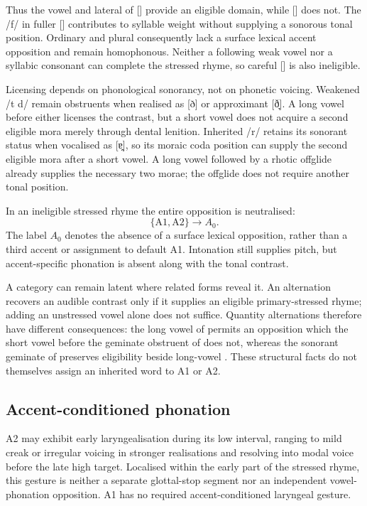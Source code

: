 Thus the vowel and lateral of  [] provide an eligible domain, while  [] does not. The /f/ in fuller [] contributes to syllable weight without supplying a sonorous tonal position. Ordinary  and plural  consequently lack a surface lexical accent opposition and remain homophonous. Neither a following weak vowel nor a syllabic consonant can complete the stressed rhyme, so careful [] is also ineligible.

Licensing depends on phonological sonorancy, not on phonetic voicing. Weakened /t d/ remain obstruents when realised as [ð] or approximant [ð̞]. A long vowel before either licenses the contrast, but a short vowel does not acquire a second eligible mora merely through dental lenition. Inherited /r/ retains its sonorant status when vocalised as [ɐ̯], so its moraic coda position can supply the second eligible mora after a short vowel. A long vowel followed by a rhotic offglide already supplies the necessary two morae; the offglide does not require another tonal position.

In an ineligible stressed rhyme the entire opposition is neutralised:
\[
    \{\mathrm{A1},\mathrm{A2}\}\longrightarrow A_0.
\]
The label $A_0$ denotes the absence of a surface lexical opposition, rather than a third accent or assignment to default A1. Intonation still supplies pitch, but accent-specific phonation is absent along with the tonal contrast.

A category can remain latent where related forms reveal it. An alternation recovers an audible contrast only if it supplies an eligible primary-stressed rhyme; adding an unstressed vowel alone does not suffice. Quantity alternations therefore have different consequences: the long vowel of  permits an opposition which the short vowel before the geminate obstruent of  does not, whereas the sonorant geminate of  preserves eligibility beside long-vowel . These structural facts do not themselves assign an inherited word to A1 or A2.

\subsection{Accent-conditioned phonation}
\label{sec:accent-phonation}

A2 may exhibit early laryngealisation during its low interval, ranging to mild creak or irregular voicing in stronger realisations and resolving into modal voice before the late high target. Localised within the early part of the stressed rhyme, this gesture is neither a separate glottal-stop segment nor an independent vowel-phonation opposition. A1 has no required accent-conditioned laryngeal gesture.

